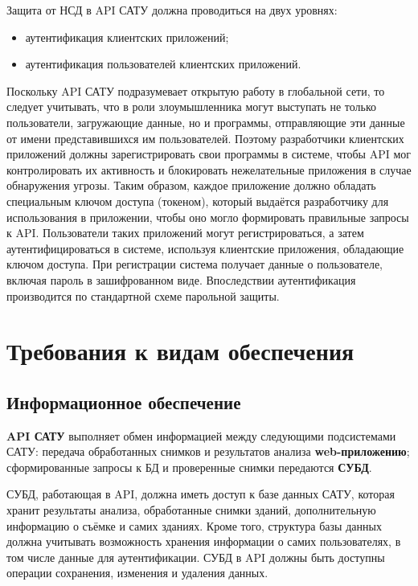 	Защита от НСД в API САТУ должна проводиться на двух уровнях: 

	\begin{itemize}
		\item аутентификация клиентских приложений;
		\item аутентификация пользователей клиентских приложений.
	\end{itemize}
 
	Поскольку API САТУ подразумевает открытую работу в глобальной сети, то следует учитывать, что в роли злоумышленника могут выступать не только пользователи, загружающие данные, но и программы, отправляющие эти данные от имени представившихся им пользователей. Поэтому разработчики клиентских приложений должны зарегистрировать свои программы в системе, чтобы API мог контролировать их активность и блокировать нежелательные приложения в случае обнаружения угрозы. Таким образом, каждое приложение должно обладать специальным ключом доступа (токеном), который выдаётся разработчику для использования в приложении, чтобы оно могло формировать правильные запросы к API.
	Пользователи таких приложений могут регистрироваться, а затем аутентифицироваться в системе, используя клиентские приложения, обладающие ключом доступа. При регистрации система получает данные о пользователе, включая пароль в зашифрованном виде. Впоследствии аутентификация производится по стандартной схеме парольной защиты.

\section{Требования к видам обеспечения}

\subsection{Информационное обеспечение}

\par

	\textbf{API САТУ} выполняет обмен информацией между следующими подсистемами САТУ: передача обработанных снимков и результатов анализа \textbf{web-приложению}; сформированные запросы к БД и проверенные снимки передаются \textbf{СУБД}.
 
	СУБД, работающая в API, должна иметь доступ к базе данных САТУ, которая хранит результаты анализа, обработанные снимки зданий, дополнительную информацию о съёмке и самих зданиях. Кроме того, структура базы данных должна учитывать возможность хранения информации о самих пользователях, в том числе данные для аутентификации. СУБД в API должны быть доступны операции сохранения, изменения и удаления данных.
 
